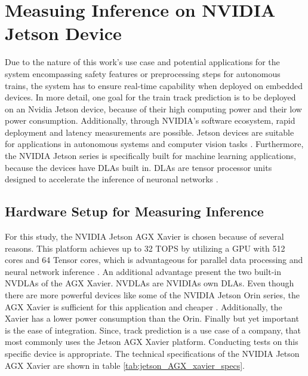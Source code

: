 \section{Measuing Inference on NVIDIA Jetson Device}

Due to the nature of this work's use case and potential applications for the system encompassing safety features or preprocessing steps for autonomous trains, the system has to ensure real-time capability when deployed on embedded devices. 
In more detail, one goal for the train track prediction is to be deployed on an Nvidia Jetson device, because of their high computing power and their low power consumption.
Additionally, through NVIDIA's software ecosystem, rapid deployment and latency measurements are possible.
Jetson devices are suitable for applications in autonomous systems and computer vision tasks \cite{nvidia_jetson_embedded_devices}.
Furthermore, the NVIDIA Jetson series is specifically built for machine learning applications, because the devices have \ac{DLA}s built in.
\ac{DLA}s are tensor processor units designed to accelerate the inference of neuronal networks \cite{nvidia_dlas}.

\subsection{Hardware Setup for Measuring Inference}

For this study, the NVIDIA Jetson AGX Xavier is chosen because of several reasons.
This platform achieves up to 32 TOPS by utilizing a \ac{GPU} with 512 cores and 64 Tensor cores, which is advantageous for parallel data processing and neural network inference \cite{nvidia_jetson_agx_xavier_datasheet}.
An additional advantage present the two built-in \ac{NVDLA}s of the AGX Xavier.
\ac{NVDLA}s are NVIDIAs own \ac{DLA}s.
Even though there are more powerful devices like some of the NVIDIA Jetson Orin series, the AGX Xavier is sufficient for this application and cheaper \cite{nvidia_jetson_embedded_devices_prices}.
Additionally, the Xavier has a lower power consumption than the Orin.
Finally but yet important is the ease of integration.
Since, track prediction is a use case of a company, that most commonly uses the Jetson AGX Xavier platform.
Conducting tests on this specific device is appropriate.
The technical specifications of the NVIDIA Jetson AGX Xavier are shown in table \ref{tab:jetson_AGX_xavier_specs}.

